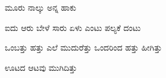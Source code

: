 \documentclass[main.tex]{subfiles}
\begin{document}
{\begin{poem}
\begin{stanza}
{    }
  ಮೂರು ನಾಲ್ಕು ಅನ್ನ ಹಾಕು
  \end{stanza}
  \begin{stanza}
    ಐದು ಆರು ಬೇಳೆ ಸಾರು \verseline
    ಏಳು ಎಂಟು ಪಲ್ಯಕೆ ದಂಟು
  \end{stanza}
  \begin{stanza}
    ಒಂಬತ್ತು ಹತ್ತು ಎಲೆ ಮುದುರೆತ್ತು \verseline
    ಒಂದರಿಂದ ಹತ್ತು ಹೀಗಿತ್ತು
  \end{stanza}
  \begin{stanza}
    ಊಟದ ಆಟವು ಮುಗಿದಿತ್ತು
  \end{stanza}
\end{poem}
\raggedleft
}
\end{document}

